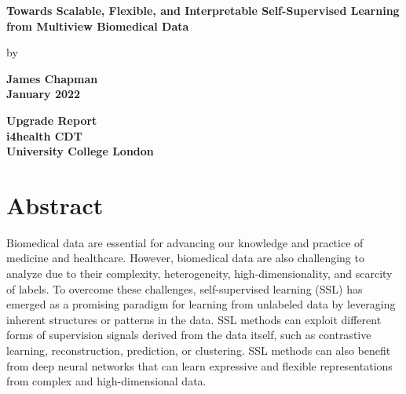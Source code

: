 \documentclass{report}
\author{James Chapman}
\numberwithin{figure}{chapter}
\numberwithin{table}{section}
\begin{document}
\begin{titlepage}
\begin{center}
    {\LARGE\textbf{Towards Scalable, Flexible, and Interpretable Self-Supervised Learning from Multiview Biomedical Data}
\author{James Chapman\\
    \\}}

    \vspace{0.8cm}
    by\\
    \vspace{0.8cm}

    {\LARGE\textbf{James Chapman\\}}
    \vspace{1.5cm}
    {\LARGE\textbf{January 2022}}

    \vfill

    \textbf{       
    Upgrade Report\\
    \vspace{1cm}
    i4health CDT\\
    University College London\\}

    \vspace{2cm}
\end{center}
\end{titlepage}


\newpage
\chapter*{Abstract} %

Biomedical data are essential for advancing our knowledge and practice of medicine and healthcare. However, biomedical data are also challenging to analyze due to their complexity, heterogeneity, high-dimensionality, and scarcity of labels. To overcome these challenges, self-supervised learning (SSL) has emerged as a promising paradigm for learning from unlabeled data by leveraging inherent structures or patterns in the data. SSL methods can exploit different forms of supervision signals derived from the data itself, such as contrastive learning, reconstruction, prediction, or clustering. SSL methods can also benefit from deep neural networks that can learn expressive and flexible representations from complex and high-dimensional data.
\end{document}
